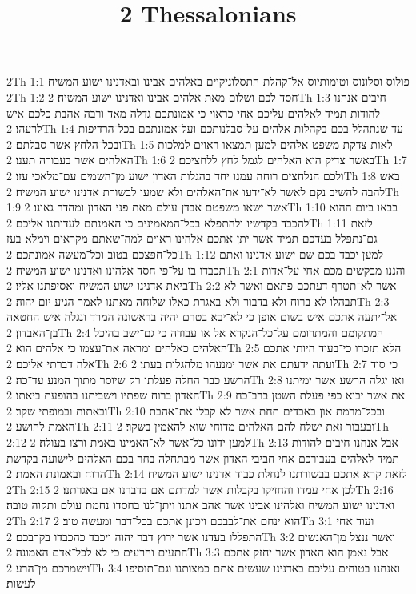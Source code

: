 

\title{2 Thessalonians}

2Th 1:1  פולוס וסלונוס וטימותיוס אל־קהלת התסלוניקיים באלהים אבינו ובאדנינו ישוע המשיח׃
2Th 1:2  חסד לכם ושלום מאת אלהים אבינו ואדנינו ישוע המשיח׃
2Th 1:3  חיבים אנחנו להודות תמיד לאלהים עליכם אחי כראוי כי אמונתכם גדלה מאד ורבה אהבת כלכם איש לרעהו׃
2Th 1:4  עד שנתהלל בכם בקהלות אלהים על־סבלנותכם ועל־אמונתכם בכל־הרדיפות ובכל־הלחץ אשר סבלתם׃
2Th 1:5  לאות צדקת משפט אלהים למען תמצאו ראוים למלכות האלהים אשר בעבורה תענו׃
2Th 1:6  באשר צדיק הוא האלהים לגמל לחץ ללחציכם׃
2Th 1:7  ולכם הנלחצים רוחה עמנו יחד בהגלות האדון ישוע מן־השמים עם־מלאכי עזו׃
2Th 1:8  באש להבה להשיב נקם לאשר לא־ידעו את־האלהים ולא שמעו לבשורת אדנינו ישוע המשיח׃
2Th 1:9  אשר ישאו משפטם אבדן עולם מאת פני האדון ומהדר גאונו׃
2Th 1:10  בבאו ביום ההוא להכבד בקדשיו ולהתפלא בכל־המאמינים כי האמנתם לעדותנו אליכם׃
2Th 1:11  לזאת גם־נתפלל בעדכם תמיד אשר יתן אתכם אלהינו ראוים למה־שאתם מקראים וימלא בעז כל־חפצכם בטוב וכל־מעשה אמונתכם׃
2Th 1:12  למען יכבד בכם שם ישוע אדנינו ואתם תכבדו בו על־פי חסד אלהינו ואדנינו ישוע המשיח׃
2Th 2:1  והננו מבקשים מכם אחי על־אדות ביאת אדנינו ישוע המשיח ואסיפתנו אליו׃
2Th 2:2  אשר לא־תטרף דעתכם פתאם ואשר לא תבהלו לא ברוח ולא בדבור ולא באגרת כאלו שלוחה מאתנו לאמר הגיע יום יהוה׃
2Th 2:3  אל־יתעה אתכם איש בשום אופן כי לא־יבא בטרם יהיה בראשונה המרד ונגלה איש החטאה בן־האבדון׃
2Th 2:4  המתקומם והמתרומם על־כל־הנקרא אל או עבודה כי גם־ישב בהיכל האלהים כאלהים ומראה את־עצמו כי אלהים הוא׃
2Th 2:5  הלא תזכרו כי־בעוד היותי אתכם אלה דברתי אליכם׃
2Th 2:6  ועתה ידעתם את אשר ימנעהו מלהגלות בעתו׃
2Th 2:7  כי סוד הרשע כבר החלה פעלתו רק שיוסר מתוך המנע עד־כה׃
2Th 2:8  ואז יגלה הרשע אשר ימיתנו האדון ברוח שפתיו וישביתנו בהופעת ביאתו׃
2Th 2:9  את אשר יבוא כפי פעלת השטן ברב־כח ובאתות ובמופתי שקר׃
2Th 2:10  ובכל־מרמת און באבדים תחת אשר לא קבלו את־אהבת האמת להושע׃
2Th 2:11  ובעבור זאת ישלח להם האלהים מדוחי שוא להאמין בשקר׃
2Th 2:12  למען ידונו כל־אשר לא־האמינו באמת ורצו בעולה׃
2Th 2:13  אבל אנחנו חיבים להודות תמיד לאלהים בעבורכם אחי חביבי האדון אשר מבתחלה בחר בכם האלהים לישועה בקדשת הרוח ובאמונת האמת׃
2Th 2:14  לזאת קרא אתכם בבשורתנו לנחלת כבוד אדנינו ישוע המשיח׃
2Th 2:15  לכן אחי עמדו והחזיקו בקבלות אשר למדתם אם בדברנו אם באגרתנו׃
2Th 2:16  ואדנינו ישוע המשיח ואלהינו אבינו אשר אהב אתנו ויתן־לנו בחסדו נחמת עולם ותקוה טובה׃
2Th 2:17  הוא ינחם את־לבבכם ויכונן אתכם בכל־דבר ומעשה טוב׃
2Th 3:1  ועוד אחי התפללו בעדנו אשר ירוץ דבר יהוה ויכבד כהכבדו בקרבכם׃
2Th 3:2  ואשר ננצל מן־האנשים התעים והרעים כי לא לכל־אדם האמונה׃
2Th 3:3  אבל נאמן הוא האדון אשר יחזק אתכם וישמרכם מן־הרע׃
2Th 3:4  ואנחנו בטוחים עליכם באדנינו שעשים אתם כמצותנו וגם־תוסיפו לעשות׃
